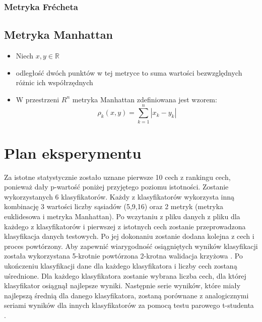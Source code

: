 \documentclass[runningheads]{llncs}
\begin{document}
\subsubsection{Metryka Fr\'echeta} 

\begin{itemize}
\item  Niech  $ x,y \in  \mathbb{R} $
\item  oraz   $ x = (x_{1},x_{2},..., x_{n}) $  
\vspace{1mm} $ y = (y_{1},y_{2},..., y_{n}) $ 
\item  Metryka Fr\'echeta zdefiniowana jest wzorem:

\vspace{5mm} $$\rho_{ch}(x,y) = \sum_{i=1}^{} }$$
\end{itemize}
\subsection{Metryka Manhattan}
\begin{itemize}
    \item Niech $x,y \in \mathbb{R}$
    \item odległość dwóch punktów w tej metryce to suma wartości bezwzględnych różnic ich współrzędnych
    \item W przestrzeni $R^n$ metryka Manhattan zdefiniowana jest wzorem:
    $$
    \rho_k(x,y) = \sum_{k=1}^{n}|x_k-y_k|
    $$
\end{itemize}
\section{Plan eksperymentu}
Za istotne statystycznie zostało uznane pierwsze 10 cech z rankingu cech, ponieważ dały p-wartość poniżej przyjętego poziomu istotności. Zostanie wykorzystanych 6 klasyfikatorów. Każdy z klasyfikatorów wykorzysta inną kombinację 3 wartości liczby sąsiadów (5,9,16) oraz 2 metryk (metryka euklidesowa i metryka Manhattan). Po wczytaniu z pliku danych z pliku dla każdego z klasyfikatorów i pierwszej z istotnych cech zostanie przeprowadzona klasyfikacja danych testowych. Po jej dokonaniu zostanie dodana kolejna z cech i proces powtórzony. Aby zapewnić wiarygodność osiągniętych wyników klasyfikacji została wykorzystana 5-krotnie powtórzona 2-krotna walidacja krzyżowa \cite{k-fold}. Po ukończeniu klasyfikacji dane dla każdego klasyfikatora i liczby cech zostaną uśrednione. Dla każdego klasyfikatora zostanie wybrana liczba cech, dla której klasyfikator osiągnął najlepsze wyniki. Następnie serie wyników, które miały najlepszą średnią dla danego klasyfikatora, zostaną porównane z analogicznymi seriami wyników dla innych klasyfikatorów za pomocą testu parowego t-studenta \cite{tstud}.
\end{document}
